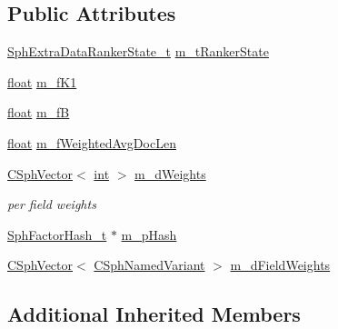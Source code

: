 \subsection*{Public Attributes}
\begin{DoxyCompactItemize}
\item 
\hyperlink{structSphExtraDataRankerState__t}{Sph\-Extra\-Data\-Ranker\-State\-\_\-t} \hyperlink{structExpr__BM25F__c_a25dfbf45de7a1245ba1a392c6d18e71b}{m\-\_\-t\-Ranker\-State}
\item 
\hyperlink{sphinxexpr_8cpp_a0e0d0739f7035f18f949c2db2c6759ec}{float} \hyperlink{structExpr__BM25F__c_aefc021dae13aaa01f05751b5e6e4ad75}{m\-\_\-f\-K1}
\item 
\hyperlink{sphinxexpr_8cpp_a0e0d0739f7035f18f949c2db2c6759ec}{float} \hyperlink{structExpr__BM25F__c_a573e1646deee609cc9b8f239a5960e3c}{m\-\_\-f\-B}
\item 
\hyperlink{sphinxexpr_8cpp_a0e0d0739f7035f18f949c2db2c6759ec}{float} \hyperlink{structExpr__BM25F__c_a631357b2c7382a52d673d0c3851da4df}{m\-\_\-f\-Weighted\-Avg\-Doc\-Len}
\item 
\hyperlink{classCSphVector}{C\-Sph\-Vector}$<$ \hyperlink{sphinxexpr_8cpp_a4a26e8f9cb8b736e0c4cbf4d16de985e}{int} $>$ \hyperlink{structExpr__BM25F__c_a280ea1ac07c64505dc7c048d3a518d40}{m\-\_\-d\-Weights}
\begin{DoxyCompactList}\small\item\em per field weights \end{DoxyCompactList}\item 
\hyperlink{sphinxint_8h_ad10cf8fddc53077dfb9d731819db9ec0}{Sph\-Factor\-Hash\-\_\-t} $\ast$ \hyperlink{structExpr__BM25F__c_a0694a50b644bc2ab7883fcac97598c99}{m\-\_\-p\-Hash}
\item 
\hyperlink{classCSphVector}{C\-Sph\-Vector}$<$ \hyperlink{structCSphNamedVariant}{C\-Sph\-Named\-Variant} $>$ \hyperlink{structExpr__BM25F__c_a537d133dd52798edfae58852ad3e40de}{m\-\_\-d\-Field\-Weights}
\end{DoxyCompactItemize}
\subsection*{Additional Inherited Members}


